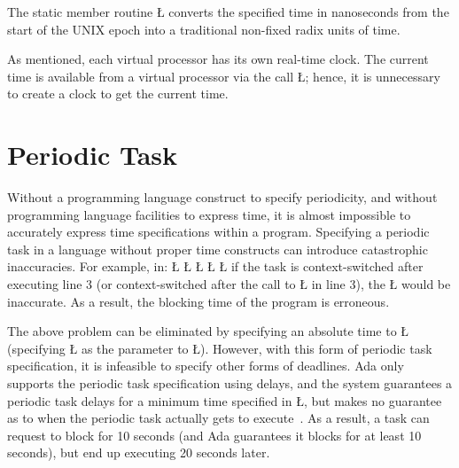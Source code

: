 \documentclass[openright,twoside]{report}
\begin{document}
The static member routine \LGinlinetrue\LGbegin\lgrinde\L{}\endlgrinde\LGend{} converts the specified time in nanoseconds from the start of the UNIX epoch into a traditional non-fixed radix units of time.

As mentioned, each virtual processor has its own real-time clock.
The current time is available from a virtual processor via the call \LGinlinetrue\LGbegin\lgrinde\L{}\endlgrinde\LGend{};
hence, it is unnecessary to create a clock to get the current time.


\section{Periodic Task}

Without a programming language construct to specify periodicity, and without programming language facilities to express time, it is almost impossible to accurately express time specifications within a program.
Specifying a periodic task in a language without proper time constructs can introduce catastrophic inaccuracies.
For example, in:
{
\LGinlinefalse\LGbegin\lgrinde
\L{}
\L{\LB{}}
\CE{}\L{\LB{}}
\L{\LB{}}
\L{\LB{\}}}
\endlgrinde\LGend
}%
if the task is context-switched after executing line 3 (or context-switched after the call to \LGinlinetrue\LGbegin\lgrinde\L{}\endlgrinde\LGend{} in line 3), the \LGinlinetrue\LGbegin\lgrinde\L{}\endlgrinde\LGend{} would be inaccurate.
As a result, the blocking time of the program is erroneous.

The above problem can be eliminated by specifying an absolute time to \LGinlinetrue\LGbegin\lgrinde\L{}\endlgrinde\LGend{} (specifying \LGinlinetrue\LGbegin\lgrinde\L{}\endlgrinde\LGend{} as the parameter to \LGinlinetrue\LGbegin\lgrinde\L{}\endlgrinde\LGend{}).
However, with this form of periodic task specification, it is infeasible to specify other forms of deadlines.
Ada only supports the periodic task specification using delays, and the system guarantees a periodic task delays for a minimum time specified in \LGinlinetrue\LGbegin\lgrinde\L{}\endlgrinde\LGend{}, but makes no guarantee as to when the periodic task actually gets to execute~\cite{Baker91a}.
As a result, a task can request to block for 10 seconds (and Ada guarantees it blocks for at least 10 seconds), but end up executing 20 seconds later.
\end{document}
